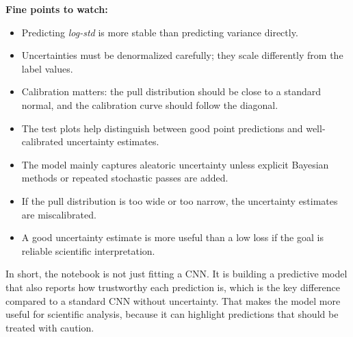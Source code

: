 \documentclass[11pt,a4paper]{article}
\begin{document}
\textbf{Fine points to watch:}

\begin{itemize}
	\item Predicting \textit{log-std} is more stable than predicting variance directly.
	\item Uncertainties must be denormalized carefully; they scale differently from the label values.
	\item Calibration matters: the pull distribution should be close to a standard normal, and the calibration curve should follow the diagonal.
	\item The test plots help distinguish between good point predictions and well-calibrated uncertainty estimates.
	\item The model mainly captures aleatoric uncertainty unless explicit Bayesian methods or repeated stochastic passes are added.
	\item If the pull distribution is too wide or too narrow, the uncertainty estimates are miscalibrated.
	\item A good uncertainty estimate is more useful than a low loss if the goal is reliable scientific interpretation.
\end{itemize}

In short, the notebook is not just fitting a CNN. It is building a predictive model that also reports how trustworthy each prediction is, which is the key difference compared to a standard CNN without uncertainty. That makes the model more useful for scientific analysis, because it can highlight predictions that should be treated with caution.
\end{document}
